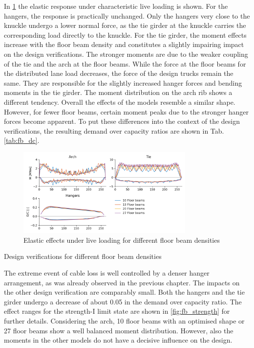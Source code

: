 In \cref{fig:fb_live} the elastic response under characteristic live loading is shown. For the hangers, the response is practically unchanged. Only the hangers very close to the knuckle undergo a lower normal force, as the tie girder at the knuckle carries the corresponding load directly to the knuckle. For the tie girder, the moment effects increase with the floor beam density and constitutes a slightly impairing impact on the design verifications. The stronger moments are due to the weaker coupling of the tie and the arch at the floor beams. While the force at the floor beams for the distributed lane load decreases, the force of the design trucks remain the same. They are responsible for the slightly increased hanger forces and bending moments in the tie girder. The moment distribution on the arch rib shows a different tendency. Overall the effects of the models resemble a similar shape. However, for fewer floor beams, certain moment peaks due to the stronger hanger forces become apparent. To put these differences into the context of the design verifications, the resulting demand over capacity ratios are shown in Tab. \ref{tab:fb_dc}.

\begin{figure}
    \centering
    \includegraphics[trim={0 0.4cm 0 0.4cm},clip, width=0.78\textwidth]{calculations/floor beam comparison/live loading.png}
    \caption{Elastic effects under live loading for different floor beam densities}
    \label{fig:fb_live}
\end{figure}

\begin{table}[H]
    \centering
    \resizebox{\columnwidth}{!}{%
    
    }
    \caption{Design verifications for different floor beam densities}
    \label{tab:fb_dc}
\end{table}

The extreme event of cable loss is well controlled by a denser hanger arrangement, as was already observed in the previous chapter. The impacts on the other design verification are comparably small. Both the hangers and the tie girder undergo a decrease of about 0.05 in the demand over capacity ratio. The effect ranges for the strength-I limit state are shown in \cref{fig:fb_strength} for further details. Considering the arch, 10 floor beams with an optimised shape or 27 floor beams show a well balanced moment distribution. However, also the moments in the other models do not have a decisive influence on the design.

